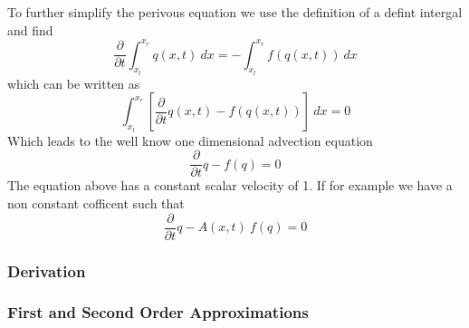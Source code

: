 \documentclass[review,onefignum,onetabnum]{siamart171218}
\begin{document}
To further simplify the perivous equation we use the definition of a defint intergal and find 
\begin{equation}
     \frac{\partial}{\partial t} \int_{x_l}^{x_r} q(x,t) \: dx= - \int_{x_l}^{x_r} f(q(x,t))\: dx
\end{equation}
which can be written as 
\begin{equation}
    \int_{x_l}^{x_r} \left[ \frac{\partial}{\partial t} q(x,t) -  f(q(x,t)) \right] \: dx = 0
\end{equation}
Which leads to the well know one dimensional advection equation
\begin{equation}
    \frac{\partial}{\partial t} q - f(q) = 0 
\end{equation}
The equation above has a constant scalar velocity of 1. If for example we have a non constant cofficent such that 
\begin{equation}
    \frac{\partial}{\partial t} q - A(x,t) \: f(q) = 0 
\end{equation}
\subsubsection{Derivation}

\subsubsection{First and Second Order Approximations}
\end{document}
